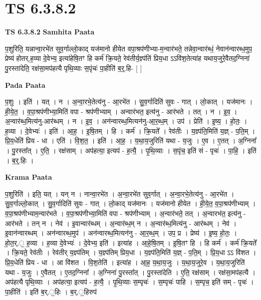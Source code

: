 \documentclass[17pt]{extarticle}
\begin{document}
\section{ TS 6.3.8.2 }

\textbf{TS 6.3.8.2 } \newline
\textbf{Samhita Paata} \newline

प॒शुरिति॒ यन्नान्वा॒रभे॑त सुव॒र्गाल्लो॒काद् यज॑मानो हीयेत वपा॒श्रप॑णीभ्या-म॒न्वार॑भते॒ तन्नेवा॒न्वार॑ब्धं॒ नेवान॑न्वारब्ध॒मुप॒ प्रेष्य॑ होतर्.ह॒व्या दे॒वेभ्य॒ इत्या॑हेषि॒तꣳ हि कर्म॑ क्रि॒यते॒ रेव॑तीर्य॒ज्ञ्प॑तिं प्रिय॒धा ऽऽवि॑श॒तेत्या॑ह यथाय॒जुरे॒वैतद॒ग्निना॑ पु॒रस्ता॑देति॒ रक्ष॑सा॒मप॑हत्यै पृथि॒व्याः स॒पृंचः॑ पा॒हीति॑ ब॒र्॒.हि- [  ] \newline

\textbf{Pada Paata} \newline

प॒शुः । इति॑ । यत् । न । अ॒न्वा॒रभे॒तेत्य॑नु - आ॒रभे॑त । सु॒व॒र्गादिति॑ सुवः - गात् । लो॒कात् । यज॑मानः । ही॒ये॒त॒ । व॒पा॒श्रप॑णीभ्या॒मिति॑ वपा - श्रप॑णीभ्याम् । अन्वार॑भत॒ इत्य॑नु - आर॑भते । तत् । न । इ॒व॒ । अ॒न्वार॑ब्ध॒मित्य॑नु-आर॑ब्धम् । न । इ॒व॒ । अन॑न्वारब्ध॒मित्यन॑नु-आ॒र॒ब्ध॒म् । उप॑ । प्रेति॑ । इ॒ष्य॒ । हो॒तः॒ । ह॒व्या । दे॒वेभ्यः॑ । इति॑ । आ॒ह॒ । इ॒षि॒तम् । हि । कर्म॑ । क्रि॒यते᳚ । रेव॑तीः । य॒ज्ञ्प॑ति॒मिति॑ य॒ज्ञ् - प॒ति॒म् । प्रि॒य॒धेति॑ प्रिय - धा । एति॑ । वि॒श॒त॒ । इति॑ । आ॒ह॒ । य॒था॒य॒जुरिति॑ यथा - य॒जुः । ए॒व । ए॒तत् । अ॒ग्निना᳚ । पु॒रस्ता᳚त् । ए॒ति॒ । रक्ष॑साम् । अप॑हत्या॒ इत्यप॑ - ह॒त्यै॒ । पृ॒थि॒व्याः । स॒पृंच॒ इति॑ सं - पृचः॑ । पा॒हि॒ । इति॑ । ब॒र्॒.हिः ।  \newline


\textbf{Krama Paata} \newline

प॒शुरिति॑ । इति॒ यत् । यन् न । नान्वा॒रभे॑त । अ॒न्वा॒रभे॑त सुव॒र्गात् । अ॒न्वा॒रभे॒तेत्य॑नु - आ॒रभे॑त । सु॒व॒र्गाल्लो॒कात् । सु॒व॒र्गादिति॑ सुवः - गात् । लो॒काद् यज॑मानः । यज॑मानो हीयेत । ही॒ये॒त॒ व॒पा॒श्रप॑णीभ्याम् । व॒पा॒श्रप॑णीभ्याम॒न्वार॑भते । व॒पा॒श्रप॑णीभ्या॒मिति॑ वपा - श्रप॑णीभ्याम् । अ॒न्वार॑भते॒ तत् । अ॒न्वारभ॑त॒ इत्य॑नु - आर॑भते । तन् न । नेव॑ । इ॒वान्वार॑ब्धम् । अ॒न्वार॑ब्ध॒म् न । अ॒न्वार॑ब्ध॒मित्य॑नु - आर॑ब्धम् । नेव॑ । इ॒वान॑न्वारब्धम् । अन॑न्वारब्ध॒मुप॑ । अन॑न्वारब्ध॒मित्यन॑नु - आ॒र॒ब्ध॒म् । उप॒ प्र । प्रेष्य॑ । इ॒ष्य॒ हो॒तः॒ । हो॒त॒र्.॒ ह॒व्या । ह॒व्या दे॒वेभ्यः॑ । दे॒वेभ्य॒ इति॑ । इत्या॑ह । आ॒हे॒षि॒तम् । इ॒षि॒तꣳ हि । हि कर्म॑ । कर्म॑ क्रि॒यते᳚ । क्रि॒यते॒ रेव॑तीः । रेव॑तीर् य॒ज्ञ्प॑तिम् । य॒ज्ञ्प॑तिम् प्रिय॒धा । य॒ज्ञ्प॑ति॒मिति॑ य॒ज्ञ् - प॒ति॒म् । प्रि॒य॒धा ऽऽ वि॑शत । प्रि॒य॒धेति॑ प्रिय - धा । आ वि॑शत । वि॒श॒तेति॑ । इत्या॑ह । आ॒ह॒ य॒था॒य॒जुः । य॒था॒य॒जुरे॒व । य॒था॒य॒जुरिति॑ यथा - य॒जुः । ए॒वैतत् । ए॒तद॒ग्निना᳚ । अ॒ग्निना॑ पु॒रस्ता᳚त् । पु॒रस्ता॑देति । ए॒ति॒ रक्ष॑साम् । रक्ष॑सा॒मप॑हत्यै । अप॑हत्यै पृथि॒व्याः । अप॑हत्या॒ इत्यप॑ - ह॒त्यै॒ । पृ॒थि॒व्याः स॒म्पृचः॑ । स॒म्पृचः॑ पाहि । स॒म्पृच॒ इति॑ सम् - पृचः॑ । पा॒हीति॑ । इति॑ ब॒र्.॒हिः । ब॒र्.॒हिरुप॑ \newline
\end{document}

